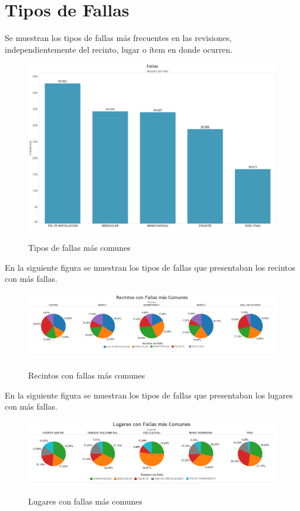 \documentclass[letter,12pt,oneside]{report}
\begin{document}
\section{Tipos de Fallas}
Se muestran los tipos de fallas más frecuentes en las revisiones, independientemente del recinto, lugar o ítem en donde ocurren.
\begin{figure}[H]
\begin{center}
\includegraphics[scale=0.7]{images/tipos_fallas.png}
\caption{Tipos de fallas más comunes}
\label{}
\end{center}
\end{figure}

En la siguiente figura se muestran los tipos de fallas que presentaban los recintos con más fallas.
\begin{figure}[H]
\begin{center}
\includegraphics[scale=0.5]{images/recintos_fallas.png}
\caption{Recintos con fallas más comunes}
\label{}
\end{center}
\end{figure}

En la siguiente figura se muestran los tipos de fallas que presentaban los lugares con más fallas.
\begin{figure}[H]
\begin{center}
\includegraphics[scale=0.56]{images/lugares_fallas.png}
\caption{Lugares con fallas más comunes}
\label{}
\end{center}
\end{figure}
\end{document}
